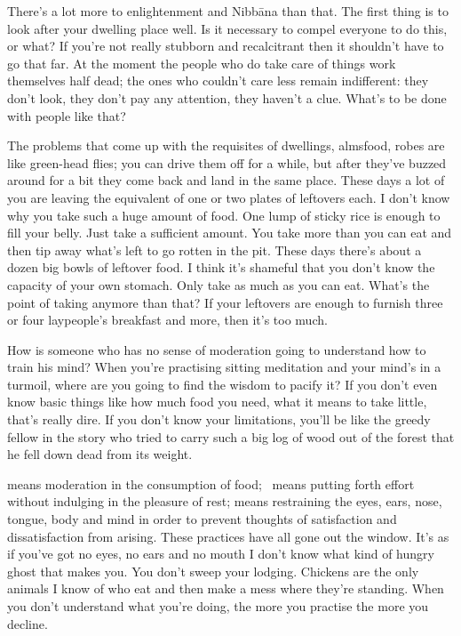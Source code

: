 There's a lot more to enlightenment and Nibb\=ana than that. The first thing is to look after your dwelling place well. Is it necessary to compel everyone to do this, or what? If you're not really stubborn and recalcitrant then it shouldn't have to go that far. At the moment the people who do take care of things work themselves half dead; the ones who couldn't care less remain indifferent: they don't look, they don't pay any attention, they haven't a clue. What's to be done with people like that?

The problems that come up with the requisites of dwellings, almsfood, robes are like green-head flies; you can drive them off for a while, but after they've buzzed around for a bit they come back and land in the same place. These days a lot of you are leaving the equivalent of one or two plates of leftovers each. I don't know why you take such a huge amount of food. One lump of sticky rice is enough to fill your belly. Just take a sufficient amount. You take more than you can eat and then tip away what's left to go rotten in the pit. These days there's about a dozen big bowls of leftover food. I think it's shameful that you don't know the capacity of your own stomach. Only take as much as you can eat. What's the point of taking anymore than that? If your leftovers are enough to furnish three or four laypeople's breakfast and more, then it's too much.

How is someone who has no sense of moderation going to understand how to train his mind? When you're practising sitting meditation and your mind's in a turmoil, where are you going to find the wisdom to pacify it? If you don't even know basic things like how much food you need, what it means to take little, that's really dire. If you don't know your limitations, you'll be like the greedy fellow in the story who tried to carry such a big log of wood out of the forest that he fell down dead from its weight.

 means moderation in the consumption of food;\linebreak\  means putting forth effort without indulging in the pleasure of rest;  means restraining the eyes, ears, nose, tongue, body and mind in order to prevent thoughts of satisfaction and dissatisfaction from arising. These practices have all gone out the window. It's as if you've got no eyes, no ears and no mouth I don't know what kind of hungry ghost that makes you. You don't sweep your lodging. Chickens are the only animals I know of who eat and then make a mess where they're standing. When you don't understand what you're doing, the more you practise the more you decline.

